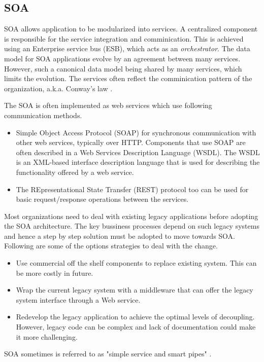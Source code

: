 \documentclass[conference]{IEEEtran}
\begin{document}
\subsection{SOA}
SOA \cite{SOA} allows application to be modularized into services. A centralized component is responsible for the service integration and comminication.
This is achieved using an Enterprise service bus (ESB), which acts as an \textit{orchestrator}. The data model for SOA applications evolve by an agreement between many services.
However, such a canonical data model being shared by many services, which limits the evolution. The services often reflect the comminication pattern of the organization, a.k.a. Conway's law \cite{conway}. \par 
The SOA is often implemented as web services which use following communication methods.
\begin{itemize}
\item Simple Object Access Protocol (SOAP) for synchronous communication with other web services, typically over HTTP. Components that use SOAP are often described in a Web Services Description Language (WSDL). The WSDL is an XML-based interface description language that is used for describing the functionality offered by a web service. 
\item The REpresentational State Transfer (REST) protocol too can be used for basic request/response operations between the services.
\end{itemize}

Most organizations need to deal with existing legacy applications before adopting the SOA architecture. The key bussiness processes depend on such legacy systems and hence a step by step solution must be adopted to move towards SOA. Following are some of the options strategies to deal with the change.
\begin{itemize}
\item Use commercial off the shelf components to replace existing system. This can be more costly in future.
\item Wrap the current legacy system with a middleware that can offer the legacy system interface through a Web service.
\item Redevelop the legacy application to achieve the optimal levels of decoupling. However, legacy code can be complex and lack of documentation could make it more challenging.
\end{itemize}
SOA sometimes is referred to as "simple service and smart pipes" \cite{comparison}.
\end{document}
